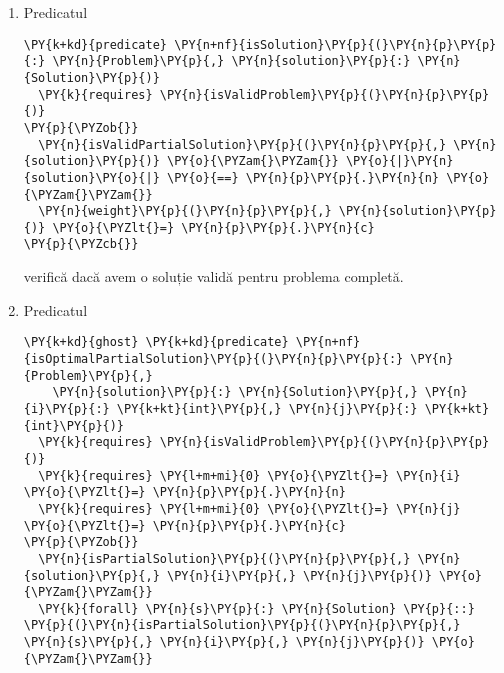 \begin{sloppypar}
\begin{enumerate}
\begin{Verbatim}[commandchars=\\\{\}]
  \PY{k}{requires} \PY{l+m+mi}{0} \PY{o}{\PYZlt{}=} \PY{n}{j} \PY{o}{\PYZlt{}=} \PY{n}{p}\PY{p}{.}\PY{n}{c}
\PY{p}{\PYZob{}}
  \PY{n}{isValidPartialSolution}\PY{p}{(}\PY{n}{p}\PY{p}{,} \PY{n}{solution}\PY{p}{)} \PY{o}{\PYZam{}\PYZam{}} \PY{o}{|}\PY{n}{solution}\PY{o}{|} \PY{o}{==} \PY{n}{i} \PY{o}{\PYZam{}\PYZam{}}
  \PY{n}{weight}\PY{p}{(}\PY{n}{p}\PY{p}{,} \PY{n}{solution}\PY{p}{)} \PY{o}{\PYZlt{}=} \PY{n}{j}
\PY{p}{\PYZcb{}}
\end{Verbatim}
    vine în completarea predicatului  și pe lângă proprietățile aduse de acesta, verifică dacă soluția este validă pentru subproblema $(i, j)$.
    \item Predicatul 
    \begin{Verbatim}[commandchars=\\\{\}]
\PY{k+kd}{predicate} \PY{n+nf}{isSolution}\PY{p}{(}\PY{n}{p}\PY{p}{:} \PY{n}{Problem}\PY{p}{,} \PY{n}{solution}\PY{p}{:} \PY{n}{Solution}\PY{p}{)}
  \PY{k}{requires} \PY{n}{isValidProblem}\PY{p}{(}\PY{n}{p}\PY{p}{)}
\PY{p}{\PYZob{}}
  \PY{n}{isValidPartialSolution}\PY{p}{(}\PY{n}{p}\PY{p}{,} \PY{n}{solution}\PY{p}{)} \PY{o}{\PYZam{}\PYZam{}} \PY{o}{|}\PY{n}{solution}\PY{o}{|} \PY{o}{==} \PY{n}{p}\PY{p}{.}\PY{n}{n} \PY{o}{\PYZam{}\PYZam{}}
  \PY{n}{weight}\PY{p}{(}\PY{n}{p}\PY{p}{,} \PY{n}{solution}\PY{p}{)} \PY{o}{\PYZlt{}=} \PY{n}{p}\PY{p}{.}\PY{n}{c}
\PY{p}{\PYZcb{}}
\end{Verbatim} 
    verifică dacă avem o soluție validă pentru problema completă.
    \item Predicatul 
    \begin{Verbatim}[commandchars=\\\{\}]
\PY{k+kd}{ghost} \PY{k+kd}{predicate} \PY{n+nf}{isOptimalPartialSolution}\PY{p}{(}\PY{n}{p}\PY{p}{:} \PY{n}{Problem}\PY{p}{,} 
    \PY{n}{solution}\PY{p}{:} \PY{n}{Solution}\PY{p}{,} \PY{n}{i}\PY{p}{:} \PY{k+kt}{int}\PY{p}{,} \PY{n}{j}\PY{p}{:} \PY{k+kt}{int}\PY{p}{)}
  \PY{k}{requires} \PY{n}{isValidProblem}\PY{p}{(}\PY{n}{p}\PY{p}{)}
  \PY{k}{requires} \PY{l+m+mi}{0} \PY{o}{\PYZlt{}=} \PY{n}{i} \PY{o}{\PYZlt{}=} \PY{n}{p}\PY{p}{.}\PY{n}{n}
  \PY{k}{requires} \PY{l+m+mi}{0} \PY{o}{\PYZlt{}=} \PY{n}{j} \PY{o}{\PYZlt{}=} \PY{n}{p}\PY{p}{.}\PY{n}{c}
\PY{p}{\PYZob{}}
  \PY{n}{isPartialSolution}\PY{p}{(}\PY{n}{p}\PY{p}{,} \PY{n}{solution}\PY{p}{,} \PY{n}{i}\PY{p}{,} \PY{n}{j}\PY{p}{)} \PY{o}{\PYZam{}\PYZam{}}
  \PY{k}{forall} \PY{n}{s}\PY{p}{:} \PY{n}{Solution} \PY{p}{::} \PY{p}{(}\PY{n}{isPartialSolution}\PY{p}{(}\PY{n}{p}\PY{p}{,} \PY{n}{s}\PY{p}{,} \PY{n}{i}\PY{p}{,} \PY{n}{j}\PY{p}{)} \PY{o}{\PYZam{}\PYZam{}} 

\end{Verbatim}
\end{enumerate}
\end{sloppypar}
